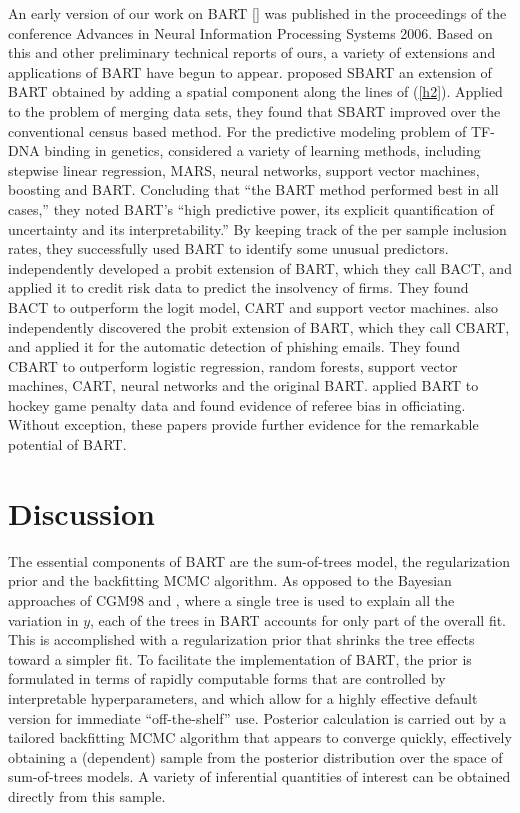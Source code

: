 \documentclass[aoas,nameyear,dvips]{arximspdf}
\newcommand{\citeasnoun}[1]{\citet{#1}}
\begin{document}
An early version of our work on BART [\citet{ChipGeorMcCu2007}] was
published in the proceedings of the conference Advances in Neural
Information Processing Systems 2006.  Based on this and other
preliminary technical reports of ours, a variety of extensions and
applications of BART have begun to appear.  \citeasnoun{ZhaShiMul2007}
proposed SBART an extension of BART obtained by adding a spatial
component along the lines of (\ref{h2}).  Applied to the problem of
merging data sets, they found that SBART improved over the conventional
census based method.  For the predictive modeling problem of TF-DNA
binding in genetics, \citeasnoun{ZhoLiu2008} considered a variety of learning methods,
including stepwise linear regression, MARS, neural networks, support
vector machines, boosting and BART.  Concluding that ``the BART method
performed best in all cases,'' they noted BART's ``high predictive
power, its explicit quantification of uncertainty and its
interpretability.''  By keeping track of the per sample inclusion
rates, they successfully used BART to identify some unusual predictors.
\citeasnoun{ZhaHae2007} independently developed a probit extension
of BART, which they call BACT,  and applied it to credit risk data to
predict the insolvency of firms.  They found BACT to outperform the
logit model, CART and support vector machines.
\citeasnoun{AbuNapWan2008} also independently discovered the probit
extension of BART, which they call CBART, and applied it for the
automatic detection of phishing emails.  They found CBART to outperform
logistic regression, random forests, support vector machines, CART,
neural networks and the original BART. \citeasnoun{AbreMcCu2006}
applied BART to hockey game penalty data and found evidence of referee
bias in officiating. Without exception, these papers provide further
evidence for the remarkable potential of BART.

\section{Discussion}\label{sec:disc}

The essential components of BART are the sum-of-trees model, the
regularization prior  and the backfitting MCMC algorithm. As opposed to the
Bayesian approaches of CGM98 and \citeasnoun{DeniMallSmit1998},
where a single tree is used to explain all the variation in $y$,
each of the trees in BART accounts for only part of the overall fit.  This is accomplished with
a regularization prior that shrinks the tree effects toward a simpler fit.
To facilitate the implementation of BART, the prior is formulated in terms of
rapidly computable forms that are controlled by interpretable hyperparameters,
and which allow for a highly effective default version for
immediate ``off-the-shelf'' use.  Posterior calculation is carried out by a
tailored backfitting MCMC algorithm that appears to converge quickly, effectively
obtaining a (dependent) sample from the posterior distribution over the space of sum-of-trees models.
A variety of inferential quantities of interest can be obtained directly from this sample.
\end{document}
